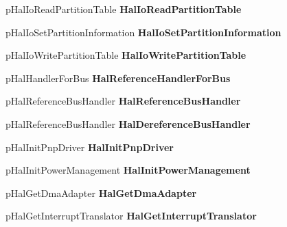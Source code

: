 \begin{DoxyCompactItemize}
p\+Hal\+Io\+Read\+Partition\+Table {\bfseries Hal\+Io\+Read\+Partition\+Table}
\item 
\mbox{\label{struct_h_a_l___d_i_s_p_a_t_c_h_abcd4211bc610a052db209b560ee791b5}} 
p\+Hal\+Io\+Set\+Partition\+Information {\bfseries Hal\+Io\+Set\+Partition\+Information}
\item 
\mbox{\label{struct_h_a_l___d_i_s_p_a_t_c_h_a0f2928f6338d90c256e6229d0285d333}} 
p\+Hal\+Io\+Write\+Partition\+Table {\bfseries Hal\+Io\+Write\+Partition\+Table}
\item 
\mbox{\label{struct_h_a_l___d_i_s_p_a_t_c_h_a72f123fa69e42c66290210a211c06cd3}} 
p\+Hal\+Handler\+For\+Bus {\bfseries Hal\+Reference\+Handler\+For\+Bus}
\item 
\mbox{\label{struct_h_a_l___d_i_s_p_a_t_c_h_a559731afc4a2ae72a891221f27c42e4e}} 
p\+Hal\+Reference\+Bus\+Handler {\bfseries Hal\+Reference\+Bus\+Handler}
\item 
\mbox{\label{struct_h_a_l___d_i_s_p_a_t_c_h_abbb3128b711bb3e2f0ce2969b5edc9cd}} 
p\+Hal\+Reference\+Bus\+Handler {\bfseries Hal\+Dereference\+Bus\+Handler}
\item 
\mbox{\label{struct_h_a_l___d_i_s_p_a_t_c_h_ae4e3d1492f56db3d096efbbba67ea632}} 
p\+Hal\+Init\+Pnp\+Driver {\bfseries Hal\+Init\+Pnp\+Driver}
\item 
\mbox{\label{struct_h_a_l___d_i_s_p_a_t_c_h_af33018360087bb5f6e6b908354bfd50e}} 
p\+Hal\+Init\+Power\+Management {\bfseries Hal\+Init\+Power\+Management}
\item 
\mbox{\label{struct_h_a_l___d_i_s_p_a_t_c_h_a88546e8f3d09e436ce57d1c8e23fdf06}} 
p\+Hal\+Get\+Dma\+Adapter {\bfseries Hal\+Get\+Dma\+Adapter}
\item 
\mbox{\label{struct_h_a_l___d_i_s_p_a_t_c_h_a09ea7926018a3edc7fc2a5f661e5f737}} 
p\+Hal\+Get\+Interrupt\+Translator {\bfseries Hal\+Get\+Interrupt\+Translator}
\item 

\end{DoxyCompactItemize}
